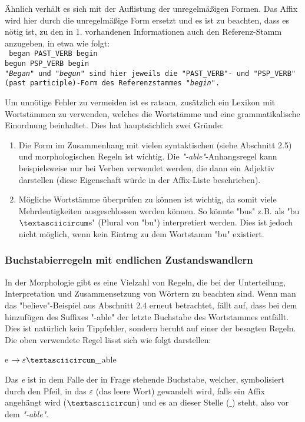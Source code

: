 \documentclass[12pt]{paper}
\begin{document}
Ähnlich verhält es sich mit der Auflistung der unregelmäßigen Formen. Das Affix wird hier durch die unregelmäßige Form ersetzt und es ist zu beachten, dass es nötig ist, zu den in 1. vorhandenen Informationen auch den Referenz-Stamm anzugeben, in etwa wie folgt:
\\
\tt
began PAST\_VERB begin\\
begun PSP\_VERB begin\\
\rm
\textit{"Began"} und \textit{"begun"} sind hier jeweils die "PAST\_VERB"- und "PSP\_VERB"(past participle)-Form des Referenzstammes \textit{"begin"}.

Um unnötige Fehler zu vermeiden ist es ratsam, zusätzlich ein Lexikon mit Wortstämmen zu verwenden, welches die Wortstämme und eine grammatikalische Einordnung beinhaltet. Dies hat hauptsächlich zwei Gründe: 

\begin{enumerate}
\item Die Form im Zusammenhang mit vielen syntaktischen (siehe Abschnitt 2.5) und morphologischen Regeln ist wichtig. Die \textit{"-able"}-Anhangsregel kann beispielsweise nur bei Verben verwendet werden, die dann ein Adjektiv darstellen (diese Eigenschaft würde in der Affix-Liste beschrieben).
\item Mögliche Wortstämme überprüfen zu können ist wichtig, da somit viele Mehrdeutigkeiten ausgeschlossen werden können. So könnte "bus" z.B. als "bu$\textasciicircum$s" (Plural von "bu") interpretiert werden. Dies ist jedoch nicht möglich, wenn kein Eintrag zu dem Wortstamm "bu" existiert. 
\end{enumerate}

\subsubsection{Buchstabierregeln mit endlichen Zustandswandlern}
In der Morphologie gibt es eine Vielzahl von Regeln, die bei der Unterteilung, Interpretation und Zusammensetzung von Wörtern zu beachten sind. Wenn man das "believe"-Beispiel aus Abschnitt 2.4 erneut betrachtet, fällt auf, dass bei dem hinzufügen des Suffixes "-able" der letzte Buchstabe des Wortstammes entfällt. Dies ist natürlich kein Tippfehler, sondern beruht auf einer der besagten Regeln. Die oben verwendete Regel lässt sich wie folgt darstellen:
\tt
\begin{center}
e $\rightarrow \varepsilon \textasciicircum \_$able
\end{center}
\rm
Das \textit{e} ist in dem Falle der in Frage stehende Buchstabe, welcher, symbolisiert durch den Pfeil, in das $\varepsilon$ (das leere Wort) gewandelt wird, falls ein Affix angehängt wird ($\textasciicircum$) und es an dieser Stelle ($\_$) steht, also vor dem \textit{"-able"}.
\end{document}
